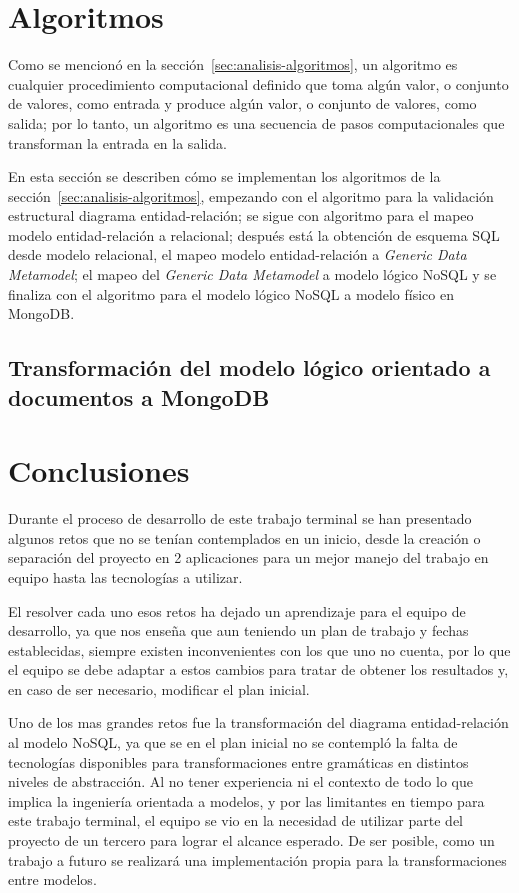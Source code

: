 \section{Algoritmos}
Como se mencionó en la sección~\ref{sec:analisis-algoritmos}, un algoritmo es cualquier procedimiento computacional definido que toma algún valor, o conjunto de valores, como entrada y produce algún valor, o conjunto de valores, como salida; por lo tanto, un algoritmo es una secuencia de pasos computacionales que transforman la entrada en la salida.


En esta sección se describen cómo se implementan los algoritmos de la sección~\ref{sec:analisis-algoritmos}, empezando con el algoritmo para la validación estructural diagrama entidad-relación; se sigue con algoritmo para el mapeo modelo entidad-relación a relacional; después está la obtención de esquema SQL desde modelo relacional, el mapeo modelo entidad-relación a \textit{Generic Data Metamodel}; el mapeo del \textit{Generic Data Metamodel} a modelo lógico NoSQL y se finaliza con el algoritmo para el modelo lógico NoSQL a modelo físico en MongoDB.




\subsection{Transformación del modelo lógico orientado a documentos a MongoDB}


\section{Conclusiones}
Durante el proceso de desarrollo de este trabajo terminal se han presentado algunos retos que no se tenían contemplados en un inicio, desde la creación o separación del proyecto en 2 aplicaciones para un mejor manejo del trabajo en equipo hasta las tecnologías a utilizar. 

El resolver cada uno esos retos ha dejado un aprendizaje para el equipo de desarrollo, ya que nos enseña que aun teniendo un plan de trabajo y fechas establecidas, siempre existen inconvenientes con los que uno no cuenta, por lo que el equipo se debe adaptar a estos cambios para tratar de obtener los resultados y, en caso de ser necesario, modificar el plan inicial.

Uno de los mas grandes retos fue la transformación del diagrama entidad-relación al modelo NoSQL, ya que se en el plan inicial no se contempló la falta de tecnologías disponibles para transformaciones entre gramáticas en distintos niveles de abstracción. Al no tener experiencia ni el contexto de todo lo que implica la ingeniería orientada a modelos, y por las limitantes en tiempo para este trabajo terminal, el equipo se vio en la necesidad de utilizar parte del proyecto de un tercero para lograr el alcance esperado. De ser posible, como un trabajo a futuro se realizará una implementación propia para la transformaciones entre modelos. 